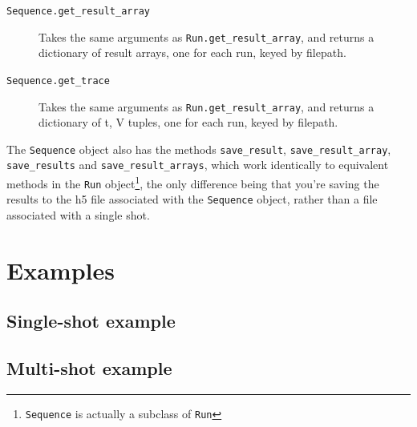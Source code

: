 \documentclass[a4paper,11pt,titlepage]{article}
\begin{document}
\begin{description}
\begin{description}
\item[\texttt{Sequence.get\_result\_array}] Takes the same arguments as \texttt{Run.get\_result\_array}, and returns a dictionary of result arrays, one for each run, keyed by filepath.

\item[\texttt{Sequence.get\_trace}]Takes the same arguments as \texttt{Run.get\_result\_array}, and returns a dictionary of t, V tuples, one for each run, keyed by filepath.


\end{description}

The \texttt{Sequence} object also has the methods \texttt{save\_result}, \texttt{save\_result\_array}, \texttt{save\_results} and \texttt{save\_result\_arrays}, which work identically to equivalent methods in the \texttt{Run} object\footnote{\texttt{Sequence} is actually a subclass of \texttt{Run}}, the only difference being that you're saving the results to the h5 file associated with the \texttt{Sequence} object, rather than a file associated with a single shot.

\end{description}


\section{Examples}
\subsection{Single-shot example}


\subsection{Multi-shot example}

\end{document}
